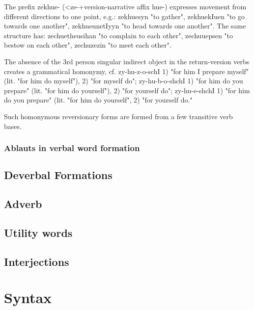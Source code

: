 \documentclass[a4paper,12pt]{book}
\newcommand{\1}[1]{\textbf{\emph{#1}}} %
\newcommand{\2}[1]{\textbf{[#1]}} %
\newcommand{\3}[1]{\fontsize{11pt}{0cm}\textbf{\emph{#1}}} %
\newcommand{\4}[1]{\fontsize{10pt}{0cm}\emph{#1}}	%
\newcommand{\5}[1]{\textbf{/#1/}} %
\newcommand{\6}[1]{\textbf{[#1]}} %
\newcommand{\7}[1]{\fontsize{12pt}{0cm}\emph{#1}} %
\newcommand{\8}[1]{\fontsize{12pt}{0cm}`#1'} %
\newcommand{\9}[1]{\fontsize{12pt}{0cm}(lit. `#1')} %
\begin{document}
The prefix zekhue- (<ze-+version-narrative affix hue-) expresses movement from different directions to one point, e.g.: zekhuesyn "to gather", zekhuekIuen "to go towards one another", zekhueunetIyyn "to head towards one another". The same structure has: zechuetheusihan "to complain to each other", zechuuepsen "to bestow on each other", zechuzezin "to meet each other".

The absence of the 3rd person singular indirect object in the return-version verbs creates a grammatical homonymy, cf. zy-hu-z-o-schI 1) "for him I prepare myself" (lit. "for him do myself"), 2) "for myself do"; zy-hu-b-o-shchI 1) "for him do you prepare" (lit. "for him do yourself"), 2) "for yourself do"; zy-hu-e-shchI 1) "for him do you prepare" (lit. "for him do yourself", 2) "for yourself do."

Such homonymous reversionary forms are formed from a few transitive verb bases.
\subsection{Ablauts in verbal word formation}

\section{Deverbal Formations}
\section{Adverb}
\section{Utility words}
\section{Interjections}
\chapter{Syntax}
\end{document}
